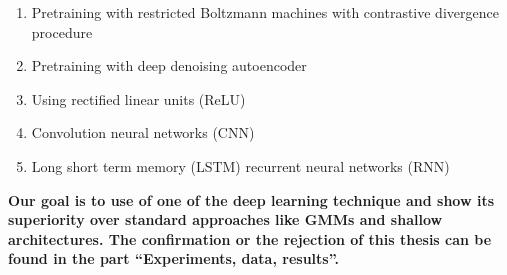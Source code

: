 \begin{enumerate}
	\item Pretraining with restricted Boltzmann machines with contrastive divergence procedure \parencite{hinton_fast_2006}
	\item Pretraining with deep denoising autoencoder \parencite{lu_speech_2013}
	\item Using rectified linear units (ReLU) \parencite{zeiler_rectified_2013}
	\item Convolution neural networks (CNN) \parencite{abdel-hamid_applying_2012}
	\item Long short term memory (LSTM) recurrent neural networks (RNN) \parencite{graves_speech_2013}
\end{enumerate}

\textbf{Our goal is to use of one of the deep learning technique and show its superiority over standard approaches like GMMs and shallow architectures. The confirmation or the rejection of this thesis can be found in the part ``Experiments, data, results''.}
